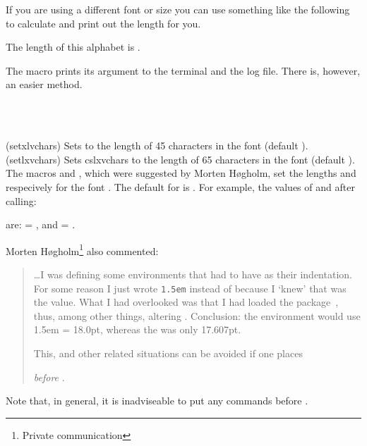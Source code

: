     If you are using a different font or size you can use something like the 
following to calculate and print out the length for you.
\begin{lcode}
\newlength{\mylen}                %
\newcommand{\alphabet}{abc...xyz} %
\begingroup                       %
\settowidth{\mylen}{\alphabet}
The length of this alphabet is \the\mylen. %
\endgroup                         %
\end{lcode}
The \cmd{\typeout} macro prints its argument to the terminal and the
log file. There is, however, an easier method.

\begin{syntax}
\cmd{\setxlvchars} \\
\cmd{\setlxvchars} \\
\end{syntax}
\glossary(setxlvchars)%
  {}%
  {Sets  to the length of 45 characters in the  
   font (default ).}
\glossary(setlxvchars)%
  {}%
  {Sets cs{lxvchars} to the length of 65 characters in the  
   font (default ).}
The macros \cmd{\setxlvchars} and \cmd{\setlxvchars}, which were suggested
by Morten H{\o}gholm, 
set the lengths \lnc{\xlvchars} and \lnc{\lxvchars}
respecively for the font . The default for 
is \cmd{\normalfont}. For example, the values of \lnc{\lxvchars} and
\lnc{\xlvchars} after calling:
\begin{lcode}
\setlxvchars \setxlvchars[\small\sffamily]
\end{lcode}
\begingroup
are: \setlxvchars\setxlvchars[\small\sffamily]
\lnc{\lxvchars} = \the\lxvchars, and \lnc{\xlvchars} = \the\xlvchars.
\endgroup

    Morten H{\o}gholm\footnote{Private communication} also commented:
\begin{quotation}
    \ldots I was defining some environments that had to have \lnc{\parindent}
as their indentation. For some reason I just wrote \verb?1.5em? instead
of \lnc{\parindent} because I `knew' that was the value. What I had 
overlooked was that I had loaded the  package~\cite{MATHPAZO},
thus, among other things,  altering \lnc{\parindent}. Conclusion: the
environment would use 1.5em = 18.0pt, whereas the \lnc{\parindent}
was only 17.607pt.

    This, and other related situations can be avoided if one places
\begin{center}
\cmd{\RequirePackage}\cmd{\normalfont}
\end{center}
\emph{before} \cmd{\documentclass}.
\end{quotation}
Note that, in general, it is inadviseable to put any 
commands before
\cmd{\documentclass}.




